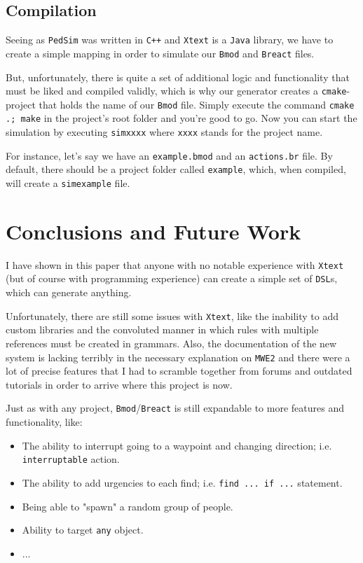 \documentclass[review]{elsarticle}
\begin{document}
\subsection{Compilation}
Seeing as \texttt{PedSim} was written in \texttt{C++} and \texttt{Xtext} is a \texttt{Java} library, we have to create a simple mapping in order to simulate our \texttt{Bmod} and \texttt{Breact} files.

But, unfortunately, there is quite a set of additional logic and functionality that must be liked and compiled validly, which is why our generator creates a \texttt{cmake}-project that holds the name of our \texttt{Bmod} file. Simply execute the command \texttt{cmake .; make} in the project's root folder and you're good to go. Now you can start the simulation by executing \texttt{simxxxx} where \texttt{xxxx} stands for the project name.

For instance, let's say we have an \texttt{example.bmod} and an \texttt{actions.br} file. By default, there should be a project folder called \texttt{example}, which, when compiled, will create a \texttt{simexample} file.

\section{Conclusions and Future Work}
I have shown in this paper that anyone with no notable experience with \texttt{Xtext} (but of course with programming experience) can create a simple set of \texttt{DSL}s, which can generate anything.

Unfortunately, there are still some issues with \texttt{Xtext}, like the inability to add custom libraries and the convoluted manner in which rules with multiple references must be created in grammars. Also, the documentation of the new system is lacking terribly in the necessary explanation on \texttt{MWE2} and there were a lot of precise features that I had to scramble together from forums and outdated tutorials in order to arrive where this project is now.

Just as with any project, \texttt{Bmod}/\texttt{Breact} is still expandable to more features and functionality, like:
\begin{itemize}
	\item The ability to interrupt going to a waypoint and changing direction; i.e. \texttt{interruptable} action.
	\item The ability to add urgencies to each find; i.e. \texttt{find ... if ...} statement.
	\item Being able to "spawn" a random group of people.
	\item Ability to target \texttt{any} object.
	\item ...
\end{itemize}


\end{document}
